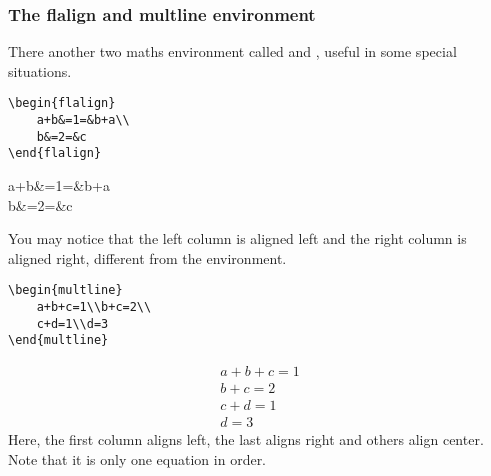 \begin{frame}[fragile]
	\small
	\frametitle{The flalign and multline environment}
	There another two maths environment called  and , useful in some special situations.\\
	\begin{minipage}{0.48\linewidth}
		\begin{example}
			\begin{verbatim}
\begin{flalign}
    a+b&=1=&b+a\\
    b&=2=&c
\end{flalign}
			\end{verbatim}
		\end{example}
		{\setlength\abovedisplayskip{-1em}
		\setlength\belowdisplayskip{0em}
		\begin{flalign}
			a+b&=1=&b+a\\
			b&=2=&c
		\end{flalign}}
		You may notice that the left column is aligned left and the right column is aligned right, different from the  environment.
	\end{minipage}
	\hfill
	\begin{minipage}{0.48\linewidth}
		\begin{example}
			\begin{verbatim}
\begin{multline}
    a+b+c=1\\b+c=2\\
    c+d=1\\d=3
\end{multline}
			\end{verbatim}
		\end{example}
		{\setlength\abovedisplayskip{-1.5em}
		\setlength\belowdisplayskip{0em}
		\begin{multline}
    		a+b+c=1\\
    		b+c=2\\
    		c+d=1\\
    		d=3
		\end{multline}}
		Here, the first column aligns left, the last aligns right and others align center. Note that it is only one equation in order.
	\end{minipage}
\end{frame}